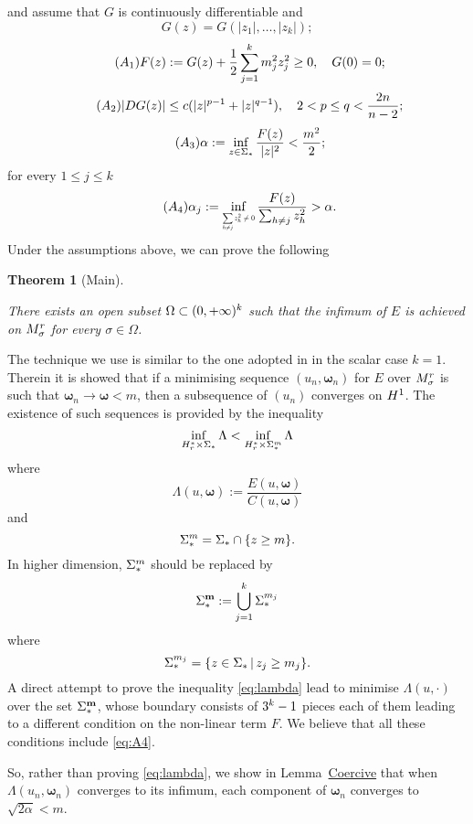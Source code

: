 \documentclass[a4paper,12pt,oneside]{amsart}
\newtheorem*{theorem*}{Theorem}
\theoremstyle{definition}
\theoremstyle{remark}
\theoremstyle{theorem}
\begin{document}
and assume that $ {G} $ is continuously differentiable and
\[
\label{eq:A0}
\tag{$ A_0 $}
{G}({z}) = {G}(|{z}_1|,\dots,|{z}_k|); 
\]
\[
\label{eq:A1}
\tag{$ A_1 $} 
{F}({z}) := {G}({z}) + \frac{1}{2}\sum_{j = 1}\sp k m_j\sp 2 {z}_j\sp 2\geq 0,\quad
{G}(0) = 0;
\]
\[
\label{eq:A2}
\tag{$ A_2 $}
|{D}{G}({z})|\leq c(|{z}|\sp{p - 1} + |{z}|\sp{q - 1}),\quad 
2 < p \leq q < \frac{2{n}}{{n} - 2};
\]
\[
\label{eq:A3}
\tag{$ A_3 $}
\alpha :=  \inf_{{z}\in\Sigma_*} \frac{{F}({z})}{|{z}|\sp 2} < \frac{m\sp 2}{2};
\]
for every $ 1\leq j \leq k $ 
\[
\label{eq:A4}
\tag{$ A_4 $}
\alpha_j := 
\inf_{\scalebox{0.57}{$ \displaystyle\sum_{h\neq j} {z}_h \sp 2\neq 0 $}}
\frac{{F}({z})}{\sum_{h\neq j} {z}_h \sp 2} > \alpha.
\]
Under the assumptions above, we can prove the following
\begin{theorem*}[Main]
\hypertarget{thm:main}{}
There exists an open subset $ \Omega\subset (0,+\infty)\sp k $ 
such that the infimum of $ E $ is achieved on $ {M}_{\sigma} \sp r $ for every
$ {\sigma}\in\Omega $.
\end{theorem*}
The technique we use is similar to the one adopted in \cite{BF09} in
the scalar case $ k = 1 $. Therein it is showed that if a minimising 
sequence $ (u_n,{\mathbf{\omega}}_n) $ for $ E $ over $ M_{\sigma}\sp r  $ is such that 
$ {\mathbf{\omega}}_n {\rightarrow} {\mathbf{\omega}} < m $, then a subsequence of $ (u_n) $ converges
on $ H\sp 1 $. The existence of such sequences is provided by the
inequality
\begin{equation}
\label{eq:lambda}
\inf_{H_r \sp * \times\Sigma_*} \Lambda < 
\inf_{H_r \sp * \times\Sigma_* \sp m} \Lambda
\end{equation}
where 
\[
\Lambda(u,{\mathbf{\omega}}) := \frac{E(u,{\mathbf{\omega}})}{C(u,{\mathbf{\omega}})}
\]
and 
\[
\Sigma_* \sp m = \Sigma_* \cap\{z\geq m\}.
\]
In higher dimension, $ \Sigma_* \sp m $ should be replaced by
\[
\Sigma_* \sp{\mathbf{m}} := \bigcup_{j = 1} \sp k \Sigma_* \sp{m_j}
\]
where
\[
\Sigma_* \sp{m_j} = \{{z}\in\Sigma_*\,|\,{z}_j\geq m_j\}.
\]
A direct attempt to prove the inequality \eqref{eq:lambda} lead to minimise 
$ \Lambda(u,\cdot) $ over the set $ \Sigma_* \sp{\mathbf{m}} $,
whose boundary consists of $ 3\sp k - 1 $ pieces each of them 
leading to a different condition on the non-linear term
$ {F} $. We believe that all these conditions include \eqref{eq:A4}. 

So, rather than proving \eqref{eq:lambda}, we show in 
Lemma~\hyperlink{lem:coercive}{Coercive} that when 
$ \Lambda(u_n,{\mathbf{\omega}}_n) $ converges to its infimum, each component of 
$ {\mathbf{\omega}}_n $ converges to $ \sqrt{2\alpha} < m $.
\end{document}
